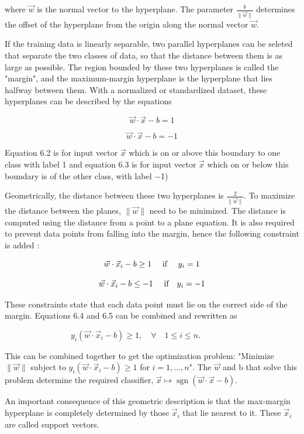 where \(\displaystyle {\vec {w}}\) is the  normal vector to the hyperplane. The parameter \(\displaystyle {\frac {b} {\|{\vec {w}}\|}}\) determines the offset of the hyperplane from the origin along the normal vector \(\displaystyle {\vec {w}}\).

If the training data is linearly separable, two parallel hyperplanes can be seleted that separate the two classes of data, so that the distance between them is as large as possible. The region bounded by these two hyperplanes is called the "margin", and the maximum-margin hyperplane is the hyperplane that lies halfway between them. With a normalized or standardized dataset, these hyperplanes can be described by the equations

\begin{equation}
    {\vec {w}}\cdot {\vec {x}}-b=1    
\end{equation}

\begin{equation}
    {\vec {w}}\cdot {\vec {x}}-b=-1
\end{equation}

Equation 6.2 is for input vector \({\vec {x}}\) which is on or above this boundary to one class with label 1 and equation 6.3 is for input vector \({\vec {x}}\) which  on or below this boundary is of the other class, with label −1)

Geometrically, the distance between these two hyperplanes is \(\displaystyle {\frac {2}{\|{\vec {w}}\|}}\). To maximize the distance between the planes, \(\displaystyle \|{\vec {w}}\|\) need to be minimized. The distance is computed using the distance from a point to a plane equation. It is also required to prevent data points from falling into the margin, hence the following constraint is added : 

\begin{equation}
    {\vec {w}}\cdot {\vec {x}}_{i}-b\geq 1\) \quad if \quad\( y_{i}=1
\end{equation}
    
\begin{equation}
    {\vec {w}}\cdot {\vec {x}}_{i}-b\leq -1\) \quad if\quad \(y_{i}=-1
\end{equation}

These constraints state that each data point must lie on the correct side of the margin. Equations 6.4 and 6.5 can be combined  and  rewritten as

\begin{equation}
    y_{i}({\vec {w}}\cdot {\vec {x}}_{i}-b)\geq 1,\quad \forall \quad 1\leq i\leq n.\qquad \qquad    
\end{equation}

This can be combined together to get the optimization problem:
"Minimize \(\|{\vec {w}}\|\) subject to \(y_{i}({\vec {w}}\cdot {\vec {x}}_{i}-b)\geq 1\) for \( i=1,\ldots ,n\)".
The \({\vec {w}}\) and b that solve this problem determine the required classifier, \({\vec {x}}\mapsto \operatorname {sgn}({\vec {w}}\cdot {\vec {x}}-b)\).

An important consequence of this geometric description is that the max-margin hyperplane is completely determined by those \({\vec {x}}_{i}\) that lie nearest to it. These \( {\vec {x}}_{i}\) are called support vectors.
\newpage